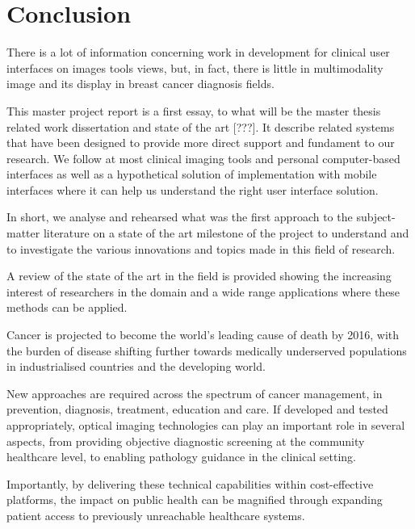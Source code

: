 
\chapter{Conclusion}
\label{chapter:conclusion}

There is a lot of information concerning work in development for clinical user interfaces on images tools views, but, in fact, there is little in multimodality image and its display in breast cancer diagnosis fields.

This master project report is a first essay, to what will be the master thesis related work dissertation and state of the art [???]. It describe related systems that have been designed to provide more direct support and fundament to our research. We follow at most clinical imaging tools and personal computer-based interfaces as well as a hypothetical solution of implementation with mobile interfaces where it can help us understand the right user interface solution.

In short, we analyse and rehearsed what was the first approach to the subject-matter literature on a state of the art milestone of the project to understand and to investigate the various innovations and topics made in this field of research.

A review of the state of the art in the field is provided showing the increasing interest of researchers in the domain and a wide range applications where these methods can be applied.

Cancer is projected to become the world's leading cause of death by 2016, with the burden of disease shifting further towards medically underserved populations in industrialised countries and the developing world.

New approaches are required across the spectrum of cancer management, in prevention, diagnosis, treatment, education and care. If developed and tested appropriately, optical imaging technologies can play an important role in several aspects, from providing objective diagnostic screening at the community healthcare level, to enabling pathology guidance in the clinical setting.

Importantly, by delivering these technical capabilities within cost-effective platforms, the impact on public health can be magnified through expanding patient access to previously unreachable healthcare systems.